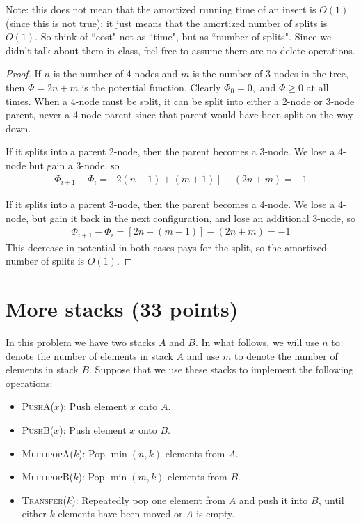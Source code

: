 \documentclass{article}
\begin{document}
Note: this does not mean that the amortized running time of an insert is $O(1)$ (since this is not true); it just means that the amortized number of splits is $O(1)$.  So think of ``cost" not as ``time", but as ``number of splits".  Since we didn't talk about them in class, feel free to assume there are no delete operations.  
\begin{proof}
	If $n$ is the number of 4-nodes and $m$ is the number of 3-nodes in the tree, then $\Phi=2n+m$ is the potential function. Clearly $\Phi_0=0,$ and $\Phi\ge 0$ at all times. When a 4-node must be split, it can be split into either a 2-node or 3-node parent, never a 4-node parent since that parent would have been split on the way down. 

	If it splits into a parent 2-node, then the parent becomes a 3-node. We lose a 4-node but gain a 3-node, so
	\begin{align*}
		\Phi_{i+1}-\Phi_i = \left[2(n-1)+(m+1)\right]-(2n+m) = -1 
	\end{align*}

	If it splits into a parent 3-node, then the parent becomes a 4-node. We lose a 4-node, but gain it back in the next configuration, and lose an additional 3-node, so 
	\begin{align*}
		\Phi_{i+1}-\Phi_i = \left[ 2n+(m-1) \right] - (2n+m) = -1
	\end{align*}
	This decrease in potential in both cases pays for the split, so the amortized number of splits is $O(1).$
\end{proof}


\newpage
\section{More stacks (33 points)}
In this problem we have two stacks $A$ and $B$.  In what follows, we will use $n$ to denote the number of elements in stack $A$ and use $m$ to denote the number of elements in stack $B$.  Suppose that  we use these stacks to implement the following operations: 
\begin{itemize}
	\item \textsc{PushA($x$)}: Push element $x$ onto $A$.
	\item \textsc{PushB($x$)}: Push element $x$ onto $B$.
	\item \textsc{MultipopA($k$)}: Pop $\min(n,k)$ elements from $A$.
	\item \textsc{MultipopB($k$)}: Pop $\min(m,k)$ elements from $B$.
	\item \textsc{Transfer($k$)}: Repeatedly pop one element from $A$ and push it into $B$, until either $k$ elements have been moved or $A$ is empty.
\end{itemize}
\end{document}
